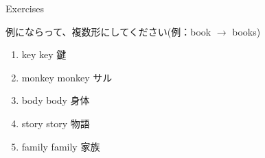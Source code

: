 \documentclass[aspectratio=169,xcolor={dvipsnames,table}]{beamer}
\newcommand{\myaudio}[1]{\href{#1}{\faVolumeUp}}
\begin{document}
\begin{frame}[plain]{Exercises}

例にならって、複数形にしてください(例：book $\longrightarrow$ books)

 \Large

\begin{enumerate}
 \item<1-> key \hfill{}{\scriptsize key  鍵}
 \item<1-> monkey \hfill{}{\scriptsize monkey  サル}
 \item<1-> body \hfill{}{\scriptsize body  身体}
 \item<1-> story \hfill{}{\scriptsize story  物語}
 \item<1-> family \hfill{}{\scriptsize family  家族}
\end{enumerate}

\hfill\myaudio{./audio/005_singular_plural_c.mp3}
\end{frame}
\end{document}
